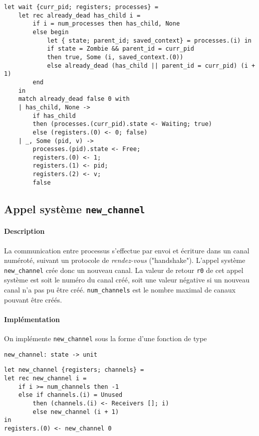 \documentclass[french, toc]{../cs-classes/cs-classes}
\begin{document}
\begin{verbatim}
let wait {curr_pid; registers; processes} =
    let rec already_dead has_child i =
        if i = num_processes then has_child, None
        else begin
            let { state; parent_id; saved_context} = processes.(i) in
            if state = Zombie && parent_id = curr_pid
            then true, Some (i, saved_context.(0))
            else already_dead (has_child || parent_id = curr_pid) (i + 1)
        end
    in
    match already_dead false 0 with
    | has_child, None ->
        if has_child
        then (processes.(curr_pid).state <- Waiting; true)
        else (registers.(0) <- 0; false)
    | _, Some (pid, v) ->
        processes.(pid).state <- Free;
        registers.(0) <- 1;
        registers.(1) <- pid;
        registers.(2) <- v;
        false
\end{verbatim}

\subsection{Appel système \texttt{new\_channel}}
\paragraph*{Description} 
La communication entre processus s’effectue par envoi et écriture dans un canal numéroté, suivant un protocole de \emph{rendez-vous} ("handshake"). L'appel système \texttt{new\_channel} crée donc un nouveau canal. La valeur de retour \texttt{r0} de cet appel système est soit le numéro du canal créé, soit une valeur négative si un nouveau canal n'a pas pu être créé. \texttt{num\_channels} est le nombre maximal de canaux pouvant être créés.

\paragraph*{Implémentation} On implémente \texttt{new\_channel} sous la forme d'une fonction de type
\begin{center}
    \texttt{new\_channel: state -> unit}
\end{center}

\begin{verbatim}
let new_channel {registers; channels} =
let rec new_channel i =
    if i >= num_channels then -1
    else if channels.(i) = Unused
        then (channels.(i) <- Receivers []; i)
        else new_channel (i + 1)
in
registers.(0) <- new_channel 0
\end{verbatim}
\end{document}
